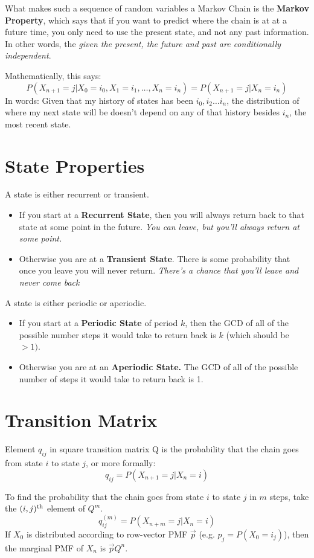 \documentclass[11.5pt]{article}
\begin{document}
\begin{notes}
What makes such a sequence of random variables a Markov Chain is the \textbf{Markov Property}, which says that if you want to predict where the chain is at at a future time, you only need to use the present state, and not any past information. In other words, the \emph{given the present, the future and past are conditionally independent}. 

Mathematically, this says: 
\[P(X_{n+1} = j | X_0 = i_0, X_1 = i_1, \dots, X_n = i_n) = P(X_{n+1} = j | X_n = i_n)\]
In words: Given that my history of states has been $i_0, i_2 \ldots i_n$, the distribution of where my next state will be doesn't depend on any of that history besides $i_n$, the most recent state. 
\section*{State Properties}
A state is either recurrent or transient.
\begin{itemize}
\item If you start at a \textbf{Recurrent State}, then you will always return back to that state at some point in the future.  \emph{You can leave, but you'll always return at some point.} 
\item Otherwise you are at a \textbf{Transient State}. There is some probability that once you leave you will never return. \emph{There's a chance that you'll leave and never come back}
\end{itemize}
A state is either periodic or aperiodic.
\begin{itemize}
\item If you start at a \textbf{Periodic State} of period $k$, then the GCD of all of the possible number steps it would take to return back is  $k$ (which should be $> 1)$.
\item Otherwise you are at an \textbf{Aperiodic State.} The GCD of all of the possible number of steps it would take to return back is 1.
\end{itemize}


\section*{Transition Matrix}
Element $q_{ij}$ in square transition matrix Q is the probability that the chain goes from state $i$ to state $j$, or more formally:
\[q_{ij} = P(X_{n+1} = j | X_n = i)\]

To find the probability that the chain goes from state $i$ to state $j$ in $m$ steps, take the $(i, j)^\textnormal{th}$ element of $Q^m$.
\[q^{(m)}_{ij} = P(X_{n+m} = j | X_n = i)\]
If $X_0$ is distributed according to row-vector PMF $\vec{p}$ (e.g. $p_j = P(X_0 = i_j)$), then the marginal PMF of $X_n$ is $\vec{p}Q^n$.




\end{notes}
\end{document}
